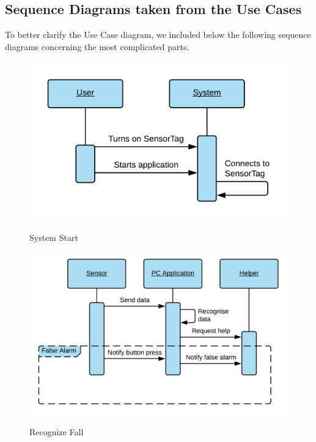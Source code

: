 \documentclass[hidelinks,conference,12pt]{IEEETran}
\begin{document}
\subsection{Sequence Diagrams taken from the Use Cases}
To better clarify the Use Case diagram, we included below the following sequence diagrams concerning the most complicated parts.

\FloatBarrier
\begin{figure}[!h]
	\centering
	\caption{System Start}
	\includegraphics[scale=0.25]{images/Seq_Sys_Start.png}
	\label{img:start}
\end{figure}
\FloatBarrier
\FloatBarrier
\begin{figure}[!h]
	\centering
	\caption{Recognize Fall}
	\includegraphics[scale=0.2]{images/Seq_Rec_Fall.png}
	\label{img:recfall}
\end{figure}
\FloatBarrier
\end{document}
